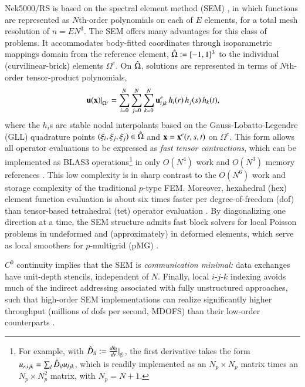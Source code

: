 Nek5000/RS is based on the spectral element method (SEM) \cite{pat84}, in which
functions are represented as $N$th-order polynomials on each of $E$ elements,
for a total mesh resolution of $n=EN^3$.  
The SEM offers many advantages for this class of problems.  It accommodates
body-fitted coordinates through isoparametric mappings domain from the
reference element, ${\hat \Omega}:=[-1,1]^3$ to the individual (curvilinear-brick)
elements $\Omega^e$.  On ${\hat \Omega}$, solutions are represented in terms of
$N$th-order tensor-product polynomials,
\begin{eqnarray} \label{eq:field1}
\left. {\bf u}({\bf x}) \right|^{}_{\Omega^e} = \sum_{i=0}^N
\sum_{j=0}^N \sum_{k=0}^N {\bf u}_{ijk}^{e}\,h_i(r)\,h_j(s)\,h_k(t),
\end{eqnarray}
where the $h_i$s are stable nodal interpolants based on the
Gauss-Lobatto-Legendre (GLL) quadrature points $(\xi_i,\xi_j,\xi_j)\in {\hat \Omega}$
and ${\bf x}={\bf x}^e(r,s,t)$ on $\Omega^e$.
This form allows all operator evaluations to be expressed as {\em fast tensor
contractions}, which can be implemented as BLAS3 operations\footnote{For
example, with ${\hat D}_{il} := \frac{d h_l}{d r} |^{}_{\xi_i}$,
the first derivative takes the form $u_{r,ijk}=\sum_l {\hat D}_{il} u_{ljk}$,
which is readily implemented as an $N_p \times N_p$ matrix times
an $N_p \times N_p^2$ matrix, with $N_p=N+1$.}
in only $O(N^4)$ work and $O(N^3)$ memory references \cite{dfm02,sao80}.
This low complexity is in sharp
contrast to the $O(N^6)$ work and storage complexity of the
traditional $p$-type FEM.  Moreover, hexahedral (hex) element function
evaluation is about six times faster per degree-of-freedom (dof) than
tensor-based tetrahedral (tet) operator evaluation \cite{moxey20}.
By diagonalizing one direction at a time, the SEM structure admits
fast block solvers for local Poisson problems in undeformed and (approximately)
in deformed elements, which serve as local smoothers for $p$-multigrid (pMG)
\cite{lottes05}.

$C^0$ continuity implies that the SEM is {\em communication minimal:}
data exchanges have unit-depth stencils, independent of $N$.
Finally, local $i$-$j$-$k$ indexing avoids much of the indirect addressing
associated with fully unstructured approaches, such that high-order SEM
implementations can
realize significantly higher throughput (millions of dofs per second, MDOFS)
than their low-order counterparts \cite{ceed_bp_paper_2020}.





